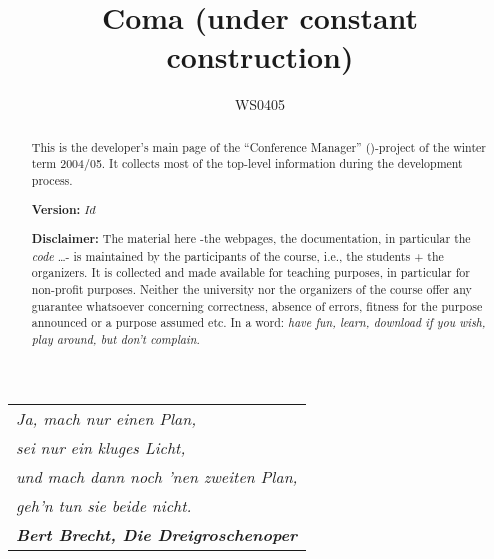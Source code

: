 \documentclass[11pt]{article}
\title{{\huge\bf Coma} (under constant construction)}
\author{WS0405}
\date{}
\begin{document}
\vspace{-2cm}





\maketitle{}



\begin{abstract}
  This is the developer's main page of the ``Conference Manager''
  (\Coma)-project of the winter term 2004/05. It collects most of the
  top-level information during the development process.

  \medskip
  
  \textbf{Version:} \texttt{$Id$}
  
  \medskip
  
  \textbf{Disclaimer:} The material here -the webpages, the documentation,
  in particular the \emph{code} \ldots- is maintained by the participants
  of the course, i.e., the students + the organizers. It is collected and
  made available for teaching purposes, in particular for non-profit
  purposes. Neither the university nor the organizers of the course offer
  any guarantee whatsoever concerning correctness, absence of errors,
  fitness for the purpose announced or a purpose assumed etc. In a word:
  \emph{have fun, learn, download if you wish, play around, but don't
    complain.}
\end{abstract}




%



%



{\centering
  \begin{minipage}{10cm}
    \begin{tabular}[t]{l}
    \em
    Ja, mach nur einen Plan, 
    \\
    \emph{sei nur ein kluges Licht, }
    \\ 
    \emph{und mach dann noch 'nen zweiten Plan, }
    \\
    \emph{geh'n tun sie beide nicht.}
    \\
    \textbf{\em Bert Brecht, Die Dreigroschenoper}
\end{tabular}
  \end{minipage}}
\end{document}
